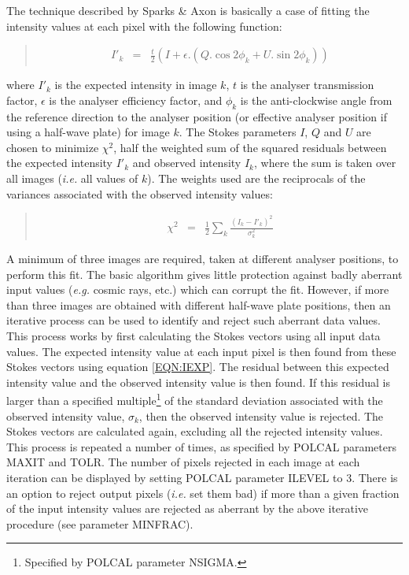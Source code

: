 \documentclass[twoside,11pt]{article}
\renewcommand{\_}{\texttt{\symbol{95}}}
\newenvironment{myquote}{\begin{quote}\begin{small}}{\end{small}\end{quote}}
\begin{document}
The technique described by Sparks \& Axon is basically a case of fitting
the intensity values at each pixel with the following function:

\begin{myquote}
\begin{eqnarray}
  \label{EQN:IEXP}
  I'_{k} & = & \frac{t}{2}( I + \epsilon.( Q.\cos 2\phi_{k} + U.\sin 2\phi_{k} ) )
\end{eqnarray}
\end{myquote}

where $I'_{k}$ is the expected intensity in image $k$, $t$ is the analyser
transmission factor, $\epsilon$ is the analyser efficiency factor, and
$\phi_{k}$ is the anti-clockwise angle from the reference direction to the
analyser position (or effective analyser position if using a half-wave
plate) for image $k$. The Stokes parameters $I$, $Q$ and $U$ are chosen
to minimize $\chi^2$, half the weighted sum of the squared residuals between 
the expected intensity $I'_{k}$ and observed intensity $I_{k}$, where the sum is taken over all images
(\emph{i.e.} all values of $k$). The weights used are the reciprocals of
the variances associated with the observed intensity values:

\begin{myquote}
\begin{eqnarray}
  \label{EQN:CHI}
  \chi^2 & = & \frac{1}{2}\sum_{k} \frac{(I_{k}-I'_{k})^2}{\sigma^2_{k}}
\end{eqnarray}
\end{myquote}

A minimum of three images are required, taken at different analyser
positions, to perform this fit. The basic algorithm gives little
protection against badly aberrant input values (\emph{e.g.} cosmic rays,
etc.) which can corrupt the fit. However, if more than three images are
obtained with different half-wave plate positions, then an iterative
process can be used to identify and reject such aberrant data values.
This process works by first calculating the Stokes vectors using all
input data values. The expected intensity value at each input pixel is
then found from these Stokes vectors using equation \ref{EQN:IEXP}. The
residual between this expected intensity value and the observed intensity
value is then found. If this residual is larger than a specified
multiple\footnote{Specified by POLCAL parameter NSIGMA.} of the standard
deviation associated with the observed intensity value, $\sigma_k$, then
the observed intensity value is rejected. The Stokes vectors are
calculated again, excluding all the rejected intensity values. This
process is repeated a number of times, as specified by POLCAL parameters
MAXIT and TOLR. The number of pixels rejected in each image at each iteration can
be displayed by setting POLCAL parameter ILEVEL to 3. There is an option
to reject output pixels (\emph{i.e.} set them bad) if more than a given
fraction of the input intensity values are rejected as aberrant by the
above iterative procedure (see parameter MINFRAC).
\end{document}
